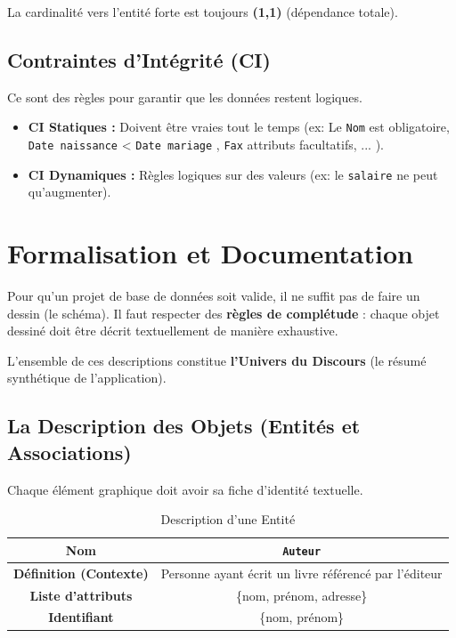 La cardinalité vers l'entité forte est toujours \textbf{(1,1)} (dépendance totale).

\subsection{Contraintes d'Intégrité (CI)}
Ce sont des règles pour garantir que les données restent logiques.

\begin{itemize}
\item \textbf{CI Statiques :} Doivent être vraies tout le temps (ex: Le \texttt{Nom} est obligatoire, \texttt{Date naissance} < \texttt{Date mariage} , \texttt{Fax} attributs facultatifs, ... ).
\item \textbf{CI Dynamiques :} Règles logiques sur des valeurs (ex: le \texttt{salaire} ne peut qu'augmenter).
\end{itemize}

\section{ Formalisation et Documentation }

Pour qu’un projet de base de données soit valide, il ne suffit pas de faire un dessin (le schéma). Il faut respecter des \textbf{règles de complétude} : chaque objet dessiné doit être décrit textuellement de manière exhaustive.

L'ensemble de ces descriptions constitue \textbf{l'Univers du Discours} (le résumé synthétique de l'application).

\subsection{ La Description des Objets (Entités et Associations) }

Chaque élément graphique doit avoir sa fiche d'identité textuelle.


\begin{table}[h]
\centering
\begin{tabular}{|c|c|}
\hline
\textbf{Nom} & \texttt{Auteur} \\
\hline
\textbf{Définition (Contexte)} & Personne ayant écrit un livre référencé par l'éditeur \\
\hline
\textbf{Liste d'attributs} & \{nom, prénom, adresse\} \\
\hline
\textbf{Identifiant} & \{nom, prénom\} \\
\hline
\end{tabular}
\caption{ Description d'une Entité }
\end{table}


